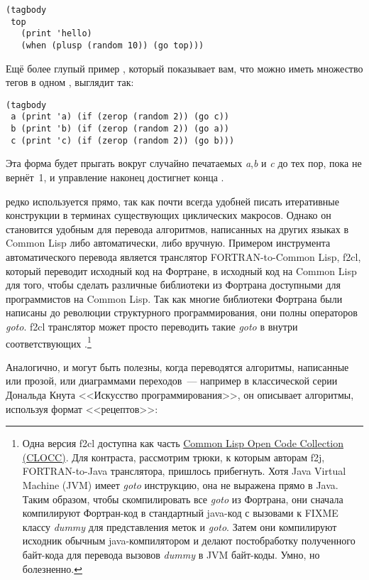 \begin{lstlisting}
(tagbody
 top
   (print 'hello)
   (when (plusp (random 10)) (go top)))
\end{lstlisting}

Ещё более глупый пример , который показывает вам, что можно иметь множество
тегов в одном , выглядит так:

\begin{lstlisting}
(tagbody
 a (print 'a) (if (zerop (random 2)) (go c))
 b (print 'b) (if (zerop (random 2)) (go a))
 c (print 'c) (if (zerop (random 2)) (go b)))
\end{lstlisting}

Эта форма будет прыгать вокруг случайно печатаемых \textit{a},\textit{b} и \textit{c} до
тех пор, пока  не вернёт~1, и управление наконец достигнет конца
.

 редко используется прямо, так как почти всегда удобней писать итеративные
конструкции в терминах существующих циклических макросов. Однако он становится удобным для
перевода алгоритмов, написанных на других языках в Common Lisp либо автоматически, либо
вручную. Примером инструмента автоматического перевода является транслятор
FORTRAN-to-Common Lisp, f2cl, который переводит исходный код на Фортране, в исходный код
на Common Lisp для того, чтобы сделать различные библиотеки из Фортрана доступными для
программистов на Common Lisp. Так как многие библиотеки Фортрана были написаны до
революции структурного программирования, они полны операторов \textit{goto}. f2cl
транслятор может просто переводить такие \textit{goto} в  внутри соответствующих
.\footnote{Одна версия f2cl доступна как часть
  \href{http://clocc.sourceforge.net/}{Common Lisp Open Code Collection (CLOCC)}. Для
  контраста, рассмотрим трюки, к которым авторам f2j, FORTRAN-to-Java транслятора,
  пришлось прибегнуть. Хотя Java Virtual Machine (JVM) имеет \textit{goto} инструкцию, она
  не выражена прямо в Java. Таким образом, чтобы скомпилировать все \textit{goto} из
  Фортрана, они сначала компилируют Фортран-код в стандартный java-код с вызовами к FIXME
  классу \textit{dummy} для представления меток и \textit{goto}. Затем они компилируют
  исходник обычным java-компилятором и делают постобработку полученного байт-кода для
  перевода вызовов \textit{dummy} в JVM байт-коды. Умно, но болезненно.}

Аналогично,  и  могут быть полезны, когда переводятся алгоритмы,
написанные или прозой, или диаграммами переходов~--- например в классической серии
Дональда Кнута <<Искусство программирования>>, он описывает алгоритмы, используя формат
<<рецептов>>: 

